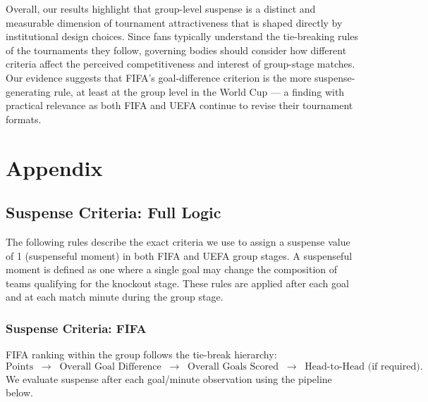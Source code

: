 \documentclass[11pt]{article}
\begin{document}
Overall, our results highlight that group-level suspense is a distinct and measurable dimension of tournament attractiveness that is shaped directly by institutional design choices. Since fans typically understand the tie-breaking rules of the tournaments they follow, governing bodies should consider how different criteria affect the perceived competitiveness and interest of group-stage matches. Our evidence suggests that FIFA's goal-difference criterion is the more suspense-generating rule, at least at the group level in the World Cup — a finding with practical relevance as both FIFA and UEFA continue to revise their tournament formats.






\appendix
\section*{Appendix}

\subsection{Suspense Criteria: Full Logic}
\label{sec:suspense-criteria}

The following rules describe the exact criteria we use to assign a suspense value of 1 (suspenseful moment) in both FIFA and UEFA group stages. A suspenseful moment is defined as one where a single goal may change the composition of teams qualifying for the knockout stage. These rules are applied after each goal and at each match minute during the group stage.

\subsubsection*{Suspense Criteria: FIFA}
\label{sec:suspense-fifa-implemented}

FIFA ranking within the group follows the tie-break hierarchy:
\[
\text{Points} \;\; \rightarrow \;\; \text{Overall Goal Difference} \;\; \rightarrow \;\; \text{Overall Goals Scored} \;\; \rightarrow \;\; \text{Head-to-Head (if required)}.
\]
We evaluate suspense after each goal/minute observation using the pipeline below.
\end{document}
